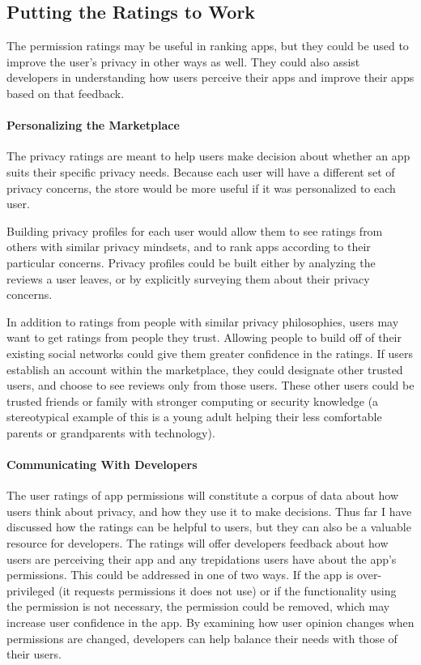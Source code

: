 \documentclass[11pt]{article}
\begin{document}
\subsection{Putting the Ratings to Work}
\label{subsec-app-selection}

The permission ratings may be useful in ranking apps, but
they could be used to improve the user's privacy in other ways as well. They could
also assist developers in understanding how users perceive their apps 
and improve their apps based on that feedback.

\paragraph{Personalizing the Marketplace}
\label{subsubsec-personalizing}

The privacy ratings are meant to help users make decision about whether
an app suits their specific privacy needs. Because each user will have a different
set of privacy concerns, the store would be more useful if it was personalized
to each user.

Building privacy profiles for each user would allow them to see ratings from
others with similar privacy mindsets, and to rank apps according to their
particular concerns. Privacy profiles could be built either by 
analyzing the reviews a user leaves, or by explicitly surveying them about their
privacy concerns. 

In addition to ratings from people with similar privacy philosophies, users may want to get
ratings from people they trust. Allowing people to build off of their existing 
social networks could give them greater confidence in the ratings. If users 
establish an account within the marketplace, they could designate other trusted
users, and choose to see reviews only from those users.
These other users could be trusted friends or family with stronger
computing or security knowledge (a stereotypical example of this is a
young adult helping their less comfortable parents or grandparents with technology).


\paragraph{Communicating With Developers}
\label{subsubsec-dev-comm}

The user ratings of app permissions will constitute a corpus of 
data about how users think about privacy, and how they use it to make decisions.
Thus far I have discussed how the ratings can be helpful to users, but
they can also be a valuable resource for developers. The ratings will offer
developers feedback about how users are perceiving their app and any trepidations users
have about the app's permissions. This could be addressed in one of two 
ways. If the app is over-privileged (it requests permissions it does not
use) or if the functionality using the permission is not necessary, the
permission could be removed, which may increase user confidence in the 
app. By examining how user opinion changes when permissions are changed,
developers can help balance their needs with those of their users. 
\end{document}
